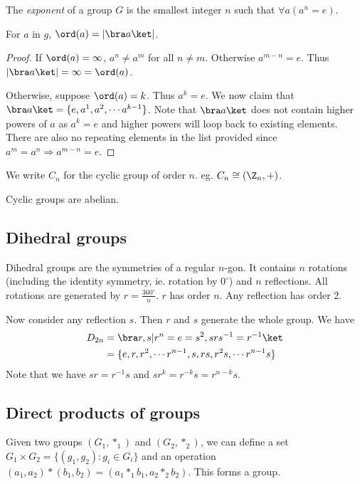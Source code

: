 \documentclass[a4paper]{article}
\begin{document}
  \begin{defi}
    The \emph{exponent} of a group $G$ is the smallest integer $n$ such that $\forall a(a^n = e)$.
  \end{defi}
  \begin{lemma}
    For $a$ in $g$, $\ord (a) = |\bra a\ket|$.
  \end{lemma}
  \begin{proof}
    If $\ord (a) = \infty$, $a^n \not= a^m$ for all $n\not= m$. Otherwise $a^{m-n} = e$. Thus $|\bra a\ket| = \infty = \ord (a)$.

    Otherwise, suppose $\ord (a) = k$. Thus $a^k = e$. We now claim that $\bra a\ket = \{e, a^1, a^2, \cdots a^{k-1}\}$. Note that $\bra a\ket$ does not contain higher powers of $a$ as $a^k = e$ and higher powers will loop back to existing elements. There are also no repeating elements in the list provided since $a^m = a^n \Rightarrow a^{m-n} = e$.
  \end{proof}

  \begin{notation}
    We write $C_n$ for the cyclic group of order $n$. eg. $C_n \cong (\Z_n, +)$.
  \end{notation}

  \begin{prop}
    Cyclic groups are abelian.
  \end{prop}

  \subsection{Dihedral groups}
  \begin{defi}
    Dihedral groups are the symmetries of a regular $n$-gon. It contains $n$ rotations (including the identity symmetry, ie. rotation by $0^\circ$) and $n$ reflections. All rotations are generated by $r = \frac{360^\circ}{n}$. $r$ has order $n$. Any reflection has order 2.

    Now consider any reflection $s$. Then $r$ and $s$ generate the whole group. We have
    \begin{align*}
      D_{2n} &= \bra r, s|r^n=e=s^2, srs^{-1} = r^{-1}\ket\\
      &= \{e, r, r^2, \cdots r^{n-1}, s, rs, r^2s, \cdots r^{n-1}s\}
    \end{align*}
    Note that we have $sr=r^{-1}s$ and $sr^k = r^{-k}s = r^{n-k}s$.
  \end{defi}

  \subsection{Direct products of groups}
  \begin{defi}
    Given two groups $(G_1, *_1)$ and $(G_2, *_2)$, we can define a set $G_1\times G_2 = \{(g_1, g_2): g_i\in G_i\}$ and an operation $(a_1, a_2)*(b_1, b_2) = (a_1*_1b_1, a_2*_2b_2)$. This forms a group.
  \end{defi}
\end{document}
